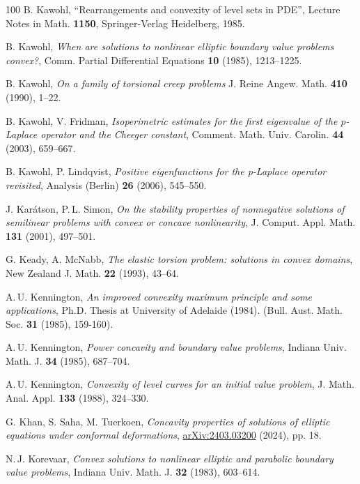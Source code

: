\documentclass[11pt, reqno]{amsart}
\theoremstyle{definition}
\numberwithin{equation}{section}
\begin{document}
\begin{thebibliography}{100}
 B. Kawohl, 
``Rearrangements and convexity of level sets in PDE'',
Lecture Notes in Math. \textbf{1150}, Springer-Verlag Heidelberg, 1985.

 B. Kawohl, 
\emph{When are solutions to nonlinear elliptic boundary value problems convex?},
Comm. Partial Differential Equations \textbf{10} (1985), %
1213--1225.

 B. Kawohl,
\emph{On a family of torsional creep problems}
J. Reine Angew. Math. \textbf{410} (1990), %
1--22.

 B. Kawohl, V. Fridman,
\emph{Isoperimetric estimates for the first eigenvalue of the $p$-Laplace operator and the Cheeger constant},
Comment. Math. Univ. Carolin. \textbf{44} (2003), %
659--667.

 B. Kawohl, P. Lindqvist,
\emph{Positive eigenfunctions for the p-Laplace operator revisited},
Analysis (Berlin) \textbf{26} (2006), %
545--550.

 J. Karátson, P.$\,$L. Simon,
\emph{On the stability properties of nonnegative solutions of semilinear problems with convex or concave nonlinearity},
J. Comput. Appl. Math. \textbf{131} (2001), %
497--501.

 G. Keady, A. McNabb, 
\emph{The elastic torsion problem: solutions in convex domains},
New Zealand J. Math. \textbf{22} (1993), %
43--64.

 A.$\,$U. Kennington,
\emph{An improved convexity maximum principle and some applications},
Ph.D. Thesis at University of Adelaide (1984). %
(Bull. Aust. Math. Soc. \textbf{31} (1985), %
159-160).
 
 A.$\,$U. Kennington,
\emph{Power concavity and boundary value problems},
Indiana Univ. Math. J. \textbf{34} (1985), %
687--704.
 
 A.$\,$U. Kennington,
\emph{Convexity of level curves for an initial value problem},
J. Math. Anal. Appl. \textbf{133} (1988), %
324--330.

 G. Khan, S. Saha, M. Tuerkoen,
\emph{Concavity properties of solutions of elliptic equations under conformal deformations},
\href{https://doi.org/10.48550/arXiv.2403.03200}{arXiv:2403.03200} (2024), pp. 18.

 N.$\,$J. Korevaar, 
\emph{Convex solutions to nonlinear elliptic and parabolic boundary value problems},
Indiana Univ. Math. J. \textbf{32} (1983), %
603--614.


\end{thebibliography}
\end{document}
